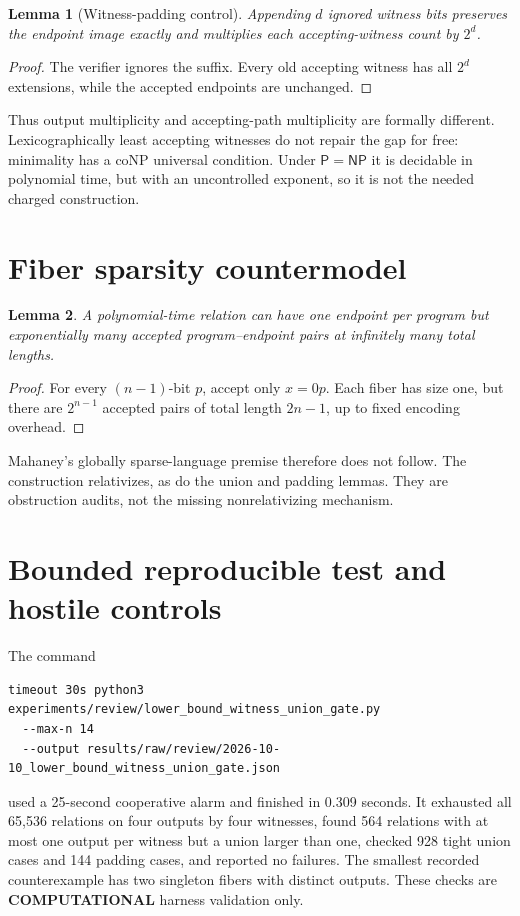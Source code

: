 \documentclass[11pt]{article}
\newtheorem{lemma}{Lemma}
\newcommand{\PP}{\mathsf P}
\newcommand{\NP}{\mathsf{NP}}
\begin{document}
\begin{lemma}[Witness-padding control]
Appending $d$ ignored witness bits preserves the endpoint image exactly
and multiplies each accepting-witness count by $2^d$.
\end{lemma}
\begin{proof}
The verifier ignores the suffix.  Every old accepting witness has all
$2^d$ extensions, while the accepted endpoints are unchanged.
\end{proof}
Thus output multiplicity and accepting-path multiplicity are formally
different.  Lexicographically least accepting witnesses do not repair the
gap for free: minimality has a coNP universal condition.  Under $\PP=\NP$
it is decidable in polynomial time, but with an uncontrolled exponent,
so it is not the needed charged construction.

\section{Fiber sparsity countermodel}
\begin{lemma}
A polynomial-time relation can have one endpoint per program but
exponentially many accepted program--endpoint pairs at infinitely many
total lengths.
\end{lemma}
\begin{proof}
For every $(n-1)$-bit $p$, accept only $x=0p$.  Each fiber has size one,
but there are $2^{n-1}$ accepted pairs of total length $2n-1$, up to fixed
encoding overhead.
\end{proof}
Mahaney's globally sparse-language premise therefore does not follow.
The construction relativizes, as do the union and padding lemmas.  They
are obstruction audits, not the missing nonrelativizing mechanism.

\section{Bounded reproducible test and hostile controls}
The command
\begin{verbatim}
timeout 30s python3 experiments/review/lower_bound_witness_union_gate.py
  --max-n 14
  --output results/raw/review/2026-10-10_lower_bound_witness_union_gate.json
\end{verbatim}
used a 25-second cooperative alarm and finished in 0.309 seconds.  It
exhausted all 65,536 relations on four outputs by four witnesses, found
564 relations with at most one output per witness but a union larger than
one, checked 928 tight union cases and 144 padding cases, and reported no
failures.  The smallest recorded counterexample has two singleton fibers
with distinct outputs.  These checks are \textbf{COMPUTATIONAL} harness
validation only.
\end{document}
